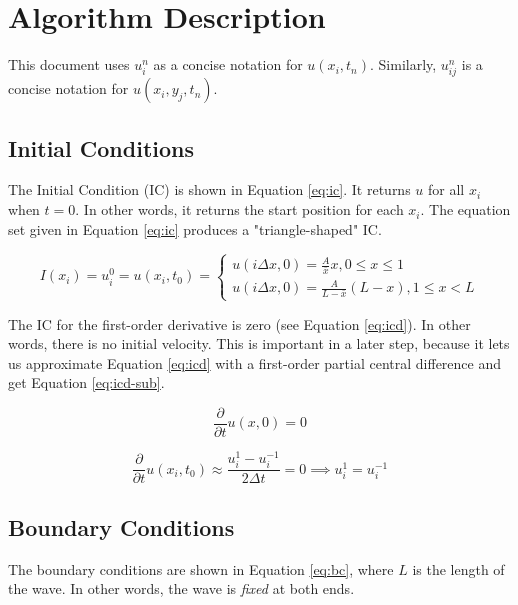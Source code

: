 \documentclass{article}
\begin{document}

\newpage
\section{Algorithm Description}
This document uses $u_i^{n}$ as a concise notation for $u(x_i, t_n)$. Similarly, $u_{ij}^n$ is a concise notation for $u(x_i, y_j, t_n)$.

\subsection{Initial Conditions}
The Initial Condition (IC) is shown in Equation \ref{eq:ic}. It returns $u$ for all $x_i$ when $t=0$. In other words, it returns the start position for each $x_i$. The equation set given in Equation \ref{eq:ic} produces a "triangle-shaped" IC.

\begin{equation}
    I(x_i)=u_i^0=u(x_i, t_0)=
        \begin{cases}
            u(i\Delta x,0)=\frac{A}{\bar x}x, 0 \leq x \leq 1\\
            u(i\Delta x,0)=\frac{A}{L-\bar x}(L-x), 1 \leq x < L
        \end{cases}
    \label{eq:ic}
\end{equation}

\noindent The IC for the first-order derivative is zero (see Equation \ref{eq:icd}). In other words, there is no initial velocity. This is important in a later step, because it lets us approximate Equation \ref{eq:icd} with a first-order partial central difference and get Equation \ref{eq:icd-sub}.

\begin{equation}
    \frac{\partial}{\partial t}u(x,0)=0
    \label{eq:icd}
\end{equation}

\begin{equation}
    \frac{\partial}{\partial t}u(x_i,t_0) \approx 
    \frac{u_i^1-u_i^{-1}}{2\Delta t} = 0 \implies
    u_i^1 = u_i^{-1}
    \label{eq:icd-sub}
\end{equation}

\subsection{Boundary Conditions}
The boundary conditions are shown in Equation \ref{eq:bc}, where $L$ is the length of the wave. In other words, the wave is \textit{fixed} at both ends.
\end{document}
